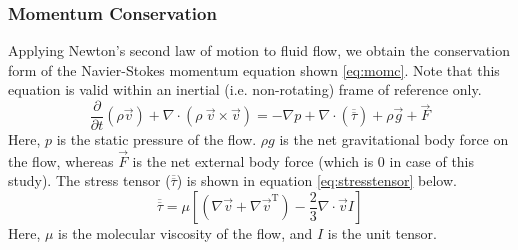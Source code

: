 \documentclass[11pt,a4paper,twoside,oneside]{article}
\begin{document}
\subsubsection{Momentum Conservation}
Applying Newton's second law of motion to fluid flow, we obtain the conservation form of the Navier-Stokes momentum equation
shown \ref{eq:momc}\cite{cfdintro}. Note that this equation is valid within an inertial (i.e. non-rotating) frame of reference only\cite{batchelor_2013}.
\begin{equation}
    \label{eq:momc}
    \frac{\partial}{\partial t}(\rho \vec{v})+\nabla \cdot(\rho\ \vec{v} \times \vec{v})=-\nabla p+\nabla \cdot(\overline{\overline{\tau}})+\rho \vec{g}+\vec{F}
\end{equation}
Here, $p$ is the static pressure of the flow. $\rho g$ is the net gravitational body force on the flow, whereas $\vec{F}$ is the net external body force (which is 0 in case of this study). The stress tensor ($\overline{\overline{\tau}}$) is shown in equation \ref{eq:stresstensor} below.
\begin{equation}\label{eq:stresstensor}
\overline{\overline{\tau}}=\mu\left[\left(\nabla \vec{v}+\nabla \vec{v}^{\mathrm{T}}\right)-\frac{2}{3} \nabla \cdot \vec{v} I\right]
\end{equation}
Here, $\mu$ is the molecular viscosity of the flow, and $I$ is the unit tensor.

\end{document}

